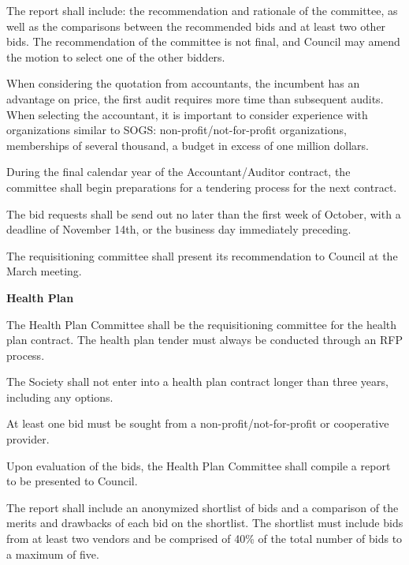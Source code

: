 \begin{longenum}[label*=\thesection.\arabic*., align=left]
\begin{longenum} [label*=\arabic*., align=left]
\begin{longenum} [label*=\arabic*., align=left]
			\item The report shall include: the recommendation and rationale of the committee, as well as the comparisons between the recommended bids and at least two other bids. The recommendation of the committee is not final, and Council may amend the motion to select one of the other bidders.
			
			\item When considering the quotation from accountants, the incumbent has an advantage on price, the first audit requires more time than subsequent audits. When selecting the accountant, it is important to consider experience with organizations similar to SOGS: non-profit/not-for-profit organizations, memberships of several thousand, a budget in excess of one million dollars. 
			
			\item During the final calendar year of the Accountant/Auditor contract, the committee shall begin preparations for a tendering process for the next contract.
			
			\item The bid requests shall be send out no later than the first week of October, with a deadline of November 14th, or the business day immediately preceding.
			
			\item The requisitioning committee shall present its recommendation to Council at the March meeting. 
\end{longenum}
\item \textbf{Health Plan}
		\begin{longenum} [label*=\arabic*., align=left]
			\item The Health Plan Committee shall be the requisitioning committee for the health plan contract. The health plan tender must always be conducted through an RFP process.
			
		\item 	The Society shall not enter into a health plan contract longer than three years, including any options.
			
		\item 	At least one bid must be sought from a non-profit/not-for-profit or cooperative provider.
			
		\item 	Upon evaluation of the bids, the Health Plan Committee shall compile a report to be presented to Council. 
			
		\item 	The report shall include an anonymized shortlist of bids and a comparison of the merits and drawbacks of each bid on the shortlist. The shortlist must include bids from at least two vendors and be comprised of 40\% of the total number of bids to a maximum of five.
		

\end{longenum}
\end{longenum}
\end{longenum}
